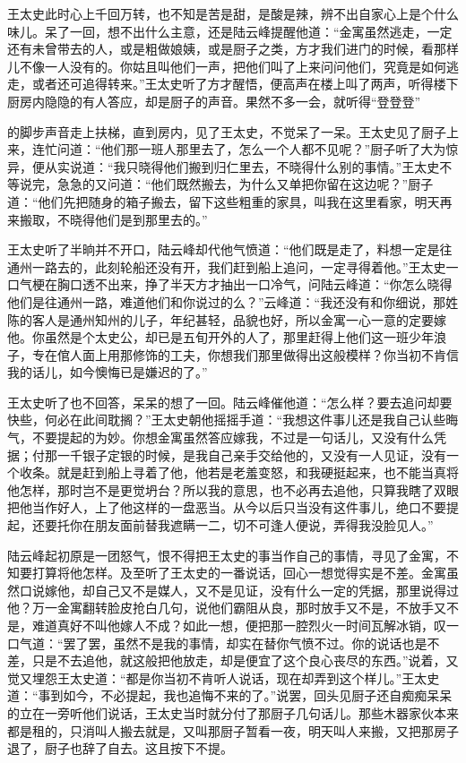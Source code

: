 \documentclass[12pt,UTF8]{ctexbook}
\begin{document}
{{{王太史此时心上千回万转，也不知是苦是甜，是酸是辣，辨不出自家心上是个什么味儿。呆了一回，想不出什么主意，还是陆云峰提醒他道：“金寓虽然逃走，一定还有未曾带去的人，或是粗做娘姨，或是厨子之类，方才我们进门的时候，看那样儿不像一人没有的。你姑且叫他们一声，把他们叫了上来问问他们，究竟是如何逃走，或者还可追得转来。”王太史听了方才醒悟，便高声在楼上叫了两声，听得楼下厨房内隐隐的有人答应，却是厨子的声音。果然不多一会，就听得“登登登”

的脚步声音走上扶梯，直到房内，见了王太史，不觉呆了一呆。王太史见了厨子上来，连忙问道：“他们那一班人那里去了，怎么一个人都不见呢？”厨子听了大为惊异，便从实说道：“我只晓得他们搬到归仁里去，不晓得什么别的事情。”王太史不等说完，急急的又问道：“他们既然搬去，为什么又单把你留在这边呢？”厨子道：“他们先把随身的箱子搬去，留下这些粗重的家具，叫我在这里看家，明天再来搬取，不晓得他们是到那里去的。”

王太史听了半晌并不开口，陆云峰却代他气愤道：“他们既是走了，料想一定是往通州一路去的，此刻轮船还没有开，我们赶到船上追问，一定寻得着他。”王太史一口气梗在胸口透不出来，挣了半天方才抽出一口冷气，问陆云峰道：“你怎么晓得他们是往通州一路，难道他们和你说过的么？”云峰道：“我还没有和你细说，那姓陈的客人是通州知州的儿子，年纪甚轻，品貌也好，所以金寓一心一意的定要嫁他。你虽然是个太史公，却已是五旬开外的人了，那里赶得上他们这一班少年浪子，专在倌人面上用那修饰的工夫，你想我们那里做得出这般模样？你当初不肯信我的话儿，如今懊悔已是嫌迟的了。”

王太史听了也不回答，呆呆的想了一回。陆云峰催他道：“怎么样？要去追问却要快些，何必在此间耽搁？”王太史朝他摇摇手道：“我想这件事儿还是我自己认些晦气，不要提起的为妙。你想金寓虽然答应嫁我，不过是一句话儿，又没有什么凭据；付那一千银子定银的时候，是我自己亲手交给他的，又没有一人见证，没有一个收条。就是赶到船上寻着了他，他若是老羞变怒，和我硬挺起来，也不能当真将他怎样，那时岂不是更觉坍台？所以我的意思，也不必再去追他，只算我瞎了双眼把他当作好人，上了他这样的一盘恶当。从今以后只当没有这件事儿，绝口不要提起，还要托你在朋友面前替我遮瞒一二，切不可逢人便说，弄得我没脸见人。”

陆云峰起初原是一团怒气，恨不得把王太史的事当作自己的事情，寻见了金寓，不知要打算将他怎样。及至听了王太史的一番说话，回心一想觉得实是不差。金寓虽然口说嫁他，却自己又不是媒人，又不是见证，没有什么一定的凭据，那里说得过他？万一金寓翻转脸皮抢白几句，说他们霸阻从良，那时放手又不是，不放手又不是，难道真好不叫他嫁人不成？如此一想，便把那一腔烈火一时间瓦解冰销，叹一口气道：“罢了罢，虽然不是我的事情，却实在替你气愤不过。你的说话也是不差，只是不去追他，就这般把他放走，却是便宜了这个良心丧尽的东西。”说着，又觉又埋怨王太史道：“都是你当初不肯听人说话，现在却弄到这个样儿。”王太史道：“事到如今，不必提起，我也追悔不来的了。”说罢，回头见厨子还自痴痴呆呆的立在一旁听他们说话，王太史当时就分付了那厨子几句话儿。那些木器家伙本来都是租的，只消叫人搬去就是，又叫那厨子暂看一夜，明天叫人来搬，又把那房子退了，厨子也辞了自去。这且按下不提。

}}}
\end{document}
